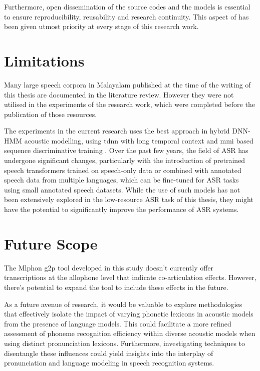 Furthermore, open dissemination of the source codes and the models is essential
to ensure reproducibility, reusability and research continuity. This aspect of
has been given utmost priority at every stage of this research work.

\section{Limitations}

Many large speech corpora in Malayalam published at the time of the writing of this thesis are documented in the literature review. However they were  not utilised in the experiments of the research work, which were completed before the publication of those resources. 

The experiments in the current research uses the best approach in hybrid DNN-HMM acoustic modelling, using \gls{tdnn} with long temporal context and \gls{mmi} based sequence discriminative training \cite{peddinti2015time,vesely2013sequence,povey2016purely,povey18_interspeech}. Over the past few years, the field of ASR has undergone significant changes, particularly with the introduction of pretrained speech transformers trained on speech-only data \cite{baevski2021unsupervised} or combined with annotated speech data \cite{radford2022robust} from multiple languages, which can be fine-tuned for ASR tasks using small annotated speech datasets. While the use of such models has not been extensively explored in the low-resource ASR task of this thesis, they might have the potential to significantly improve the performance of ASR systems.

\section{Future Scope}

The Mlphon \gls{g2p} tool developed in this study doesn't currently offer transcriptions at the allophone level that indicate co-articulation effects. However, there's potential to expand the tool to include these effects in the future.

As a future avenue of research, it would be valuable to explore methodologies that effectively isolate the impact of varying phonetic lexicons in acoustic models from the presence of language models. This could facilitate a more refined assessment of phoneme recognition efficiency within diverse acoustic models when using distinct pronunciation lexicons. Furthermore, investigating techniques to disentangle these influences could yield insights into the interplay of pronunciation and language modeling in speech recognition systems.

